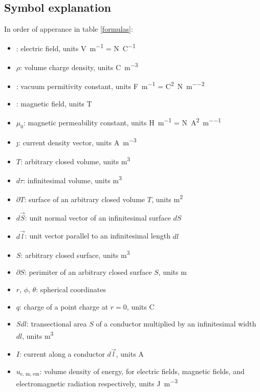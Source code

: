     \subsection{Symbol explanation}
    In order of apperance in table \ref{formulas}:  
    \begin{itemize}
        \setlength\itemsep{.1em}
        \item \E: electric field, units \si{\volt\per\metre} = \si{\newton\per\coulomb}
        \item $\rho$: volume charge density, units \si{\coulomb\per\metre\cubed}
        \item \e: vacuum permitivity constant, units \si{\farad\per\metre} = \si{\coulomb\squared\per\newton\per\metre\squared}
        \item \B: magnetic field, units \si{\tesla}
        \item $\mu_0$: magnetic permeability constant, units \si{\henry\per\metre} = \si{\newton\per\ampere\squared\per\metre}
        \item \j: current density vector, units \si{\ampere\per\metre\cubed}
        \item $T$: arbitrary closed volume, units \si{\metre\cubed}
        \item $d\tau$: infinitesimal volume, units \si{\metre\cubed}
        \item $\partial T$: surface of an arbitrary closed volume $T$, units \si{\metre\squared}
        \item $d\vec{S}$: unit normal vector of an infinitesimal surface $dS$
        \item $d\vec{l}$: unit vector parallel to an infinitesimal length $dl$
        \item $S$: arbitrary closed surface, units \si{\metre\cubed}
        \item $\partial S$: perimiter of an arbitrary closed surface $S$, units \si{\metre}
        \item $r$, $\phi$, $\theta$: spherical coordinates
        \item $q$: charge of a point charge at $r=0$, units \si{\coulomb}
        \item $Sdl$: transectional area $S$ of a conductor multiplied by an infinitesimal width $dl$, units \si{\metre\cubed}
        \item $I$: current along a conductor $d\vec{l}$, units \si{\ampere}
        \item $u_\text{e, m, em}$: volume density of energy, 
        for electric fields, magnetic fields, and electromagnetic radiation respectively, units \si{\joule\per\metre\cubed}

\end{itemize}
